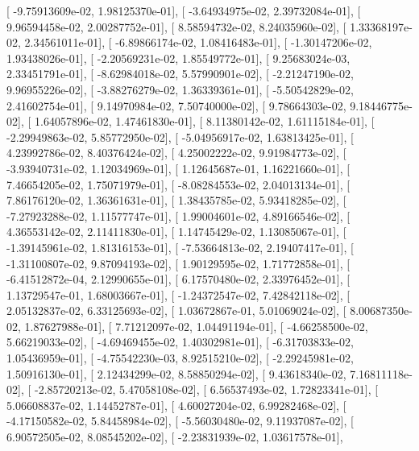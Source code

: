 \documentclass{article}
\begin{document}
       [ -9.75913609e-02,   1.98125370e-01],
       [ -3.64934975e-02,   2.39732084e-01],
       [  9.96594458e-02,   2.00287752e-01],
       [  8.58594732e-02,   8.24035960e-02],
       [  1.33368197e-02,   2.34561011e-01],
       [ -6.89866174e-02,   1.08416483e-01],
       [ -1.30147206e-02,   1.93438026e-01],
       [ -2.20569231e-02,   1.85549772e-01],
       [  9.25683024e-03,   2.33451791e-01],
       [ -8.62984018e-02,   5.57990901e-02],
       [ -2.21247190e-02,   9.96955226e-02],
       [ -3.88276279e-02,   1.36339361e-01],
       [ -5.50542829e-02,   2.41602754e-01],
       [  9.14970984e-02,   7.50740000e-02],
       [  9.78664303e-02,   9.18446775e-02],
       [  1.64057896e-02,   1.47461830e-01],
       [  8.11380142e-02,   1.61115184e-01],
       [ -2.29949863e-02,   5.85772950e-02],
       [ -5.04956917e-02,   1.63813425e-01],
       [  4.23992786e-02,   8.40376424e-02],
       [  4.25002222e-02,   9.91984773e-02],
       [ -3.93940731e-02,   1.12034969e-01],
       [  1.12645687e-01,   1.16221660e-01],
       [  7.46654205e-02,   1.75071979e-01],
       [ -8.08284553e-02,   2.04013134e-01],
       [  7.86176120e-02,   1.36361631e-01],
       [  1.38435785e-02,   5.93418285e-02],
       [ -7.27923288e-02,   1.11577747e-01],
       [  1.99004601e-02,   4.89166546e-02],
       [  4.36553142e-02,   2.11411830e-01],
       [  1.14745429e-02,   1.13085067e-01],
       [ -1.39145961e-02,   1.81316153e-01],
       [ -7.53664813e-02,   2.19407417e-01],
       [ -1.31100807e-02,   9.87094193e-02],
       [  1.90129595e-02,   1.71772858e-01],
       [ -6.41512872e-04,   2.12990655e-01],
       [  6.17570480e-02,   2.33976452e-01],
       [  1.13729547e-01,   1.68003667e-01],
       [ -1.24372547e-02,   7.42842118e-02],
       [  2.05132837e-02,   6.33125693e-02],
       [  1.03672867e-01,   5.01069024e-02],
       [  8.00687350e-02,   1.87627988e-01],
       [  7.71212097e-02,   1.04491194e-01],
       [ -4.66258500e-02,   5.66219033e-02],
       [ -4.69469455e-02,   1.40302981e-01],
       [ -6.31703833e-02,   1.05436959e-01],
       [ -4.75542230e-03,   8.92515210e-02],
       [ -2.29245981e-02,   1.50916130e-01],
       [  2.12434299e-02,   8.58850294e-02],
       [  9.43618340e-02,   7.16811118e-02],
       [ -2.85720213e-02,   5.47058108e-02],
       [  6.56537493e-02,   1.72823341e-01],
       [  5.06608837e-02,   1.14452787e-01],
       [  4.60027204e-02,   6.99282468e-02],
       [ -4.17150582e-02,   5.84458984e-02],
       [ -5.56030480e-02,   9.11937087e-02],
       [  6.90572505e-02,   8.08545202e-02],
       [ -2.23831939e-02,   1.03617578e-01],
\end{document}
